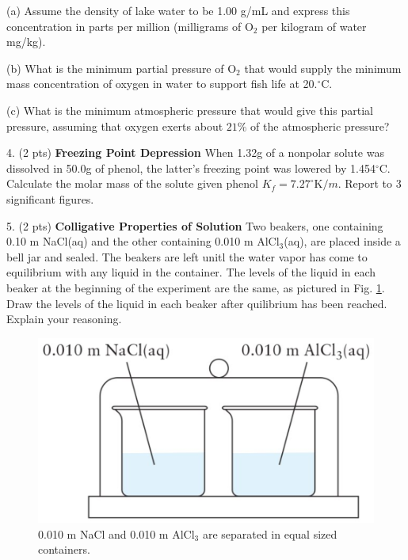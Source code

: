 \documentclass[11pt]{article}
\begin{document}
(a) Assume the density of lake water to be 1.00 g/mL and express this concentration
in parts per million (milligrams of O$_2$ per kilogram of water mg/kg).

(b) What is the minimum partial pressure of O$_2$ that would supply the minimum mass
concentration of oxygen in water to support fish life at 20.$^\circ$C.

(c) What is the minimum atmospheric pressure that would give this partial pressure,
assuming that oxygen exerts about $21\%$ of the atmospheric pressure?


\vspace{3in}


4. (2 pts) \textbf{Freezing Point Depression} When 1.32g of a nonpolar solute was dissolved in
50.0g of phenol, the latter's freezing point was lowered by 1.454$^\circ$C. Calculate
the molar mass of the solute given phenol $K_f = 7.27^\circ\text{K}/m$. Report to 3 significant
figures.


\vspace{3in}

5. (2 pts) \textbf{Colligative Properties of Solution} Two beakers, one containing 0.10 m NaCl(aq)
and the other containing 0.010 m AlCl$_3$(aq), are placed inside a bell jar and sealed.
The beakers are left unitl the water vapor has come to equilibrium with any liquid in the
container. The levels of the liquid in each beaker at the beginning of the experiment
are the same, as pictured in Fig. \ref{fig:beakers}. Draw the levels of the liquid in
each beaker after quilibrium has been reached. Explain your reasoning.

\begin{figure}[hbpt]
  \centering
  \includegraphics[scale=0.2]{nacl_alcl3.png}
  \caption{0.010 m NaCl and 0.010 m AlCl$_3$ are separated in equal sized
    containers.}
  \label{fig:beakers}
\end{figure}
\end{document}
